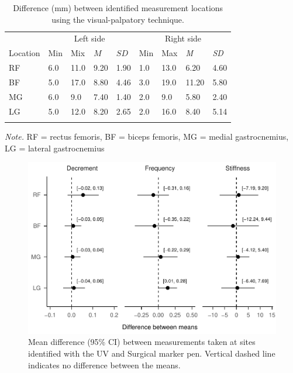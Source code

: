 \documentclass[man,floatsintext]{apa6}
\begin{document}
\begin{table}[H]

\begin{center}
\begin{threeparttable}

\caption{\label{tab:differences}Difference (mm) between identified measurement locations using the visual-palpatory technique.}

\begin{tabular}{lllllllll}
\toprule
 & \multicolumn{4}{c}{Left side} & \multicolumn{4}{c}{Right side} \\
\cmidrule(r){2-5} \cmidrule(r){6-9}
Location & Min & Mix & $M$ & $SD$ & Min & Max & \textit{M} & \textit{SD}\\
\midrule
RF & 6.0 & 11.0 & 9.20 & 1.90 & 1.0 & 13.0 & 6.20 & 4.60\\
BF & 5.0 & 17.0 & 8.80 & 4.46 & 3.0 & 19.0 & 11.20 & 5.80\\
MG & 6.0 & 9.0 & 7.40 & 1.40 & 2.0 & 9.0 & 5.80 & 2.40\\
LG & 5.0 & 12.0 & 8.20 & 2.65 & 2.0 & 16.0 & 8.40 & 5.14\\
\bottomrule
\addlinespace
\end{tabular}

\begin{tablenotes}[para]
\normalsize{\textit{Note.} RF = rectus femoris, BF = biceps femoris, MG = medial gastrocnemius, LG = lateral gastrocnemius}
\end{tablenotes}

\end{threeparttable}
\end{center}

\end{table}

\begin{figure}[H]

{\centering \includegraphics{full_phd_files/figure-latex/forrestplot-1} 

}

\caption{Mean difference (95\% CI) between measurements taken at sites identified with the UV and Surgical marker pen. Vertical dashed line indicates no difference between the means.}\label{fig:forrestplot}
\end{figure}
\end{document}
